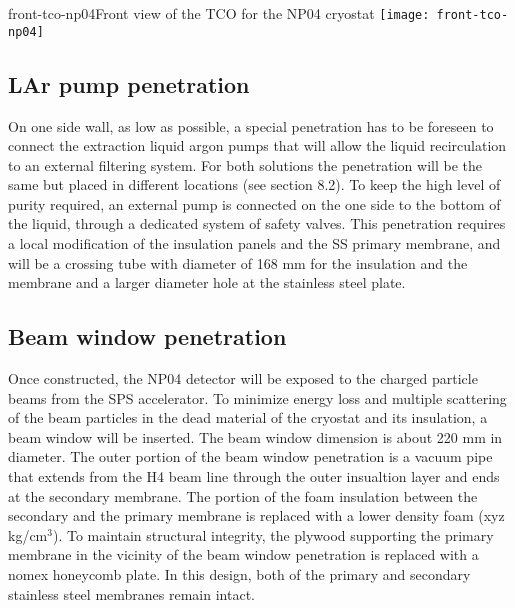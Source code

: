 \begin{cdrfigure}{front-tco-np04}{Front view of the TCO for the NP04 cryostat}
  \texttt{[image: front-tco-np04]}
\end{cdrfigure}


\subsection{LAr pump penetration}

On one side wall, as low as possible, a special penetration has to be foreseen to connect the extraction liquid argon pumps that will allow the liquid recirculation to an external filtering system. For both solutions the penetration will be the same but placed in different locations (see section 8.2).
To keep the high level of purity required, an external pump is connected on the one side to the bottom of the liquid, through a dedicated system of safety valves. This penetration requires a local modification of the insulation panels and the SS primary membrane, and will be a crossing tube with diameter of 168 mm for the insulation and the membrane and a larger diameter hole at the stainless steel plate.

\subsection{Beam window penetration}

Once constructed, the NP04 detector will be exposed to the charged particle beams from the SPS accelerator. To minimize energy loss and multiple scattering of the beam particles in the dead material of the cryostat and its insulation, a beam window will be inserted.  The beam window dimension is about 220 mm in diameter. The outer portion of the beam window penetration is a vacuum pipe that extends from the H4 beam line through the outer insualtion layer and ends at the secondary membrane. The portion of the foam insulation between the secondary and the primary membrane is replaced with a lower density foam (xyz kg/cm$^3$). To maintain structural integrity, the plywood supporting the primary membrane in the vicinity of the beam window penetration is replaced with a nomex honeycomb plate. In this design, both of the primary and secondary stainless steel membranes remain intact. 


